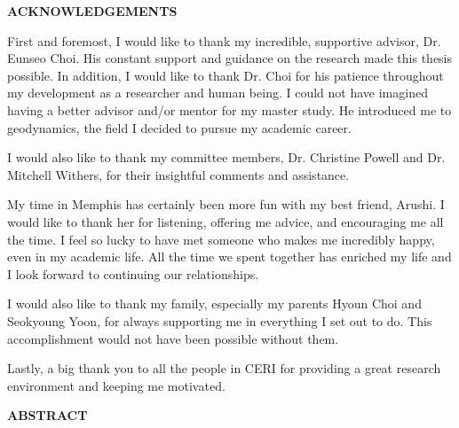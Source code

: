 \documentclass[letterpaper,12pt,notitle]{memphisthesis}                     %
\begin{document}



\doublespacing
{}

\setcounter{page}{2}

\begin{center}
	\textbf{ACKNOWLEDGEMENTS}
\end{center}
\vspace{-0.15in}

First and foremost, I would like to thank my incredible, supportive advisor, Dr. Eunseo Choi. His constant support and guidance on the research made this thesis possible. In addition, I would like to thank Dr. Choi for his patience throughout my development as a researcher and human being. I could not have imagined having a better advisor and/or mentor for my master study. He introduced me to geodynamics, the field I decided to pursue my academic career. 

I would also like to thank my committee members, Dr. Christine Powell and Dr. Mitchell Withers, for their insightful comments and assistance. 

My time in Memphis has certainly been more fun with my best friend, Arushi. I would like to thank her for listening, offering me advice, and encouraging me all the time. I feel so lucky to have met someone who makes me incredibly happy, even in my academic life. All the time we spent together has enriched my life and I look forward to continuing our relationships.

I would also like to thank my family, especially my parents Hyoun Choi and Seokyoung Yoon, for always supporting me in everything I set out to do. This accomplishment would not have been possible without them.

Lastly, a big thank you to all the people in CERI for providing a great research environment and keeping me motivated.

\newpage
\begin{center}
	\textbf{ABSTRACT}
\end{center}
\vspace{-0.15in}

\thispagestyle{plain}
\end{document}
